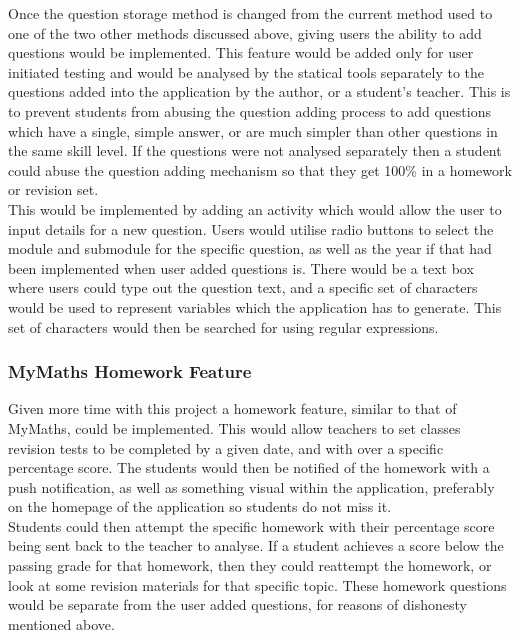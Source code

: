 \documentclass{article}
\begin{document}
Once the question storage method is changed from the current method used to one of the two other methods discussed above, giving users the ability to add questions would be implemented. This feature would be added only for user initiated testing and would be analysed by the statical tools separately to the questions added into the application by the author, or a student's teacher. This is to prevent students from abusing the question adding process to add questions which have a single, simple answer, or are much simpler than other questions in the same skill level. If the questions were not analysed separately then a student could abuse the question adding mechanism so that they get 100\% in a homework or revision set. \\

This would be implemented by adding an activity which would allow the user to input details for a new question. Users would utilise radio buttons to select the module and submodule for the specific question, as well as the year if that had been implemented when user added questions is. There would be a text box where users could type out the question text, and a specific set of characters would be used to represent variables which the application has to generate. This set of characters would then be searched for using regular expressions. \\

\subsubsection{MyMaths Homework Feature}

Given more time with this project a homework feature, similar to that of MyMaths, could be implemented. This would allow teachers to set classes revision tests to be completed by a given date, and with over a specific percentage score. The students would then be notified of the homework with a push notification, as well as something visual within the application, preferably on the homepage of the application so students do not miss it. \\

Students could then attempt the specific homework with their percentage score being sent back to the teacher to analyse. If a student achieves a score below the passing grade for that homework, then they could reattempt the homework, or look at some revision materials for that specific topic. These homework questions would be separate from the user added questions, for reasons of dishonesty mentioned above. \\
\end{document}
